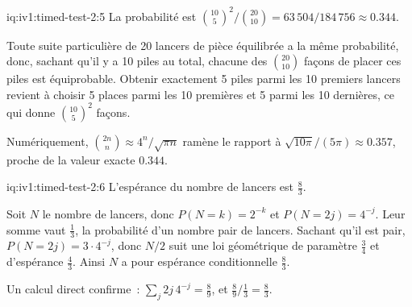 \begin{solution}{iq:iv1:timed-test-2:5}
La probabilité est $\binom{10}{5}^2/\binom{20}{10} = 63\,504/184\,756 \approx 0.344$.

Toute suite particulière de 20 lancers de pièce équilibrée a la même probabilité, donc, sachant qu'il y a 10 piles au total, chacune des $\binom{20}{10}$ façons de placer ces piles est équiprobable. Obtenir exactement 5 piles parmi les 10 premiers lancers revient à choisir 5 places parmi les 10 premières et 5 parmi les 10 dernières, ce qui donne $\binom{10}{5}^2$ façons.

Numériquement, $\binom{2n}{n} \approx 4^n/\sqrt{\pi n}$ ramène le rapport à $\sqrt{10\pi}/(5\pi) \approx 0.357$, proche de la valeur exacte $0.344$.


\end{solution}

\begin{solution}{iq:iv1:timed-test-2:6}
L'espérance du nombre de lancers est $\frac83$.

Soit $N$ le nombre de lancers, donc $P(N = k) = 2^{-k}$ et $P(N = 2j) = 4^{-j}$. Leur somme vaut $\frac13$, la probabilité d'un nombre pair de lancers. Sachant qu'il est pair, $P(N = 2j) = 3 \cdot 4^{-j}$, donc $N/2$ suit une loi géométrique de paramètre $\frac34$ et d'espérance $\frac43$. Ainsi $N$ a pour espérance conditionnelle $\frac83$.

Un calcul direct confirme~: $\sum_j 2j\,4^{-j} = \frac89$, et $\frac89 \big/ \frac13 = \frac83$.


\end{solution}

